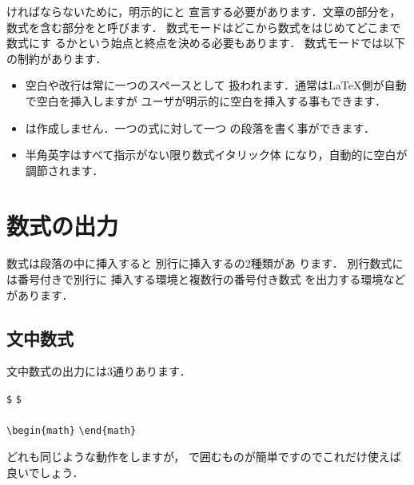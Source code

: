 ければならないために，明示的にと%
%
%
%
%
宣言する必要があります．文章の部分を，
数式を含む部分をと呼びます．
数式モードはどこから数式をはじめてどこまで数式にす
るかという始点と終点を決める必要もあります．
数式モードでは以下の制約があります．
\begin{itemize}
%
%
\item  空白や改行は常に一つのスペースとして
扱われます．通常は{\LaTeX}側が自動で空白を挿入しますが
ユーザが明示的に空白を挿入する事もできます．
\item  {}は作成しません．一つの式に対して一つ
の段落を書く事ができます．
\item  半角英字はすべて指示がない限り数式イタリック体
になり，自動的に空白が調節されます．
\end{itemize}


\section{数式の出力}
数式は段落の中に挿入する{}と
別行に挿入する{}の2種類があ
ります．
別行数式には番号付きで別行に
挿入する環境と複数行の番号付き数式
を出力する環境などがあります．

\subsection{文中数式}
文中数式の出力には3通りあります．%
\begin{Syntax}
\verb|$|  \verb|$|  \\
\cmd{(}  \cmd{)}\\
\verb|\begin{math}|  \verb|\end{math}|
\end{Syntax}
どれも同じような動作をしますが，
で囲むものが簡単ですのでこれだけ使えば良いでしょう．

